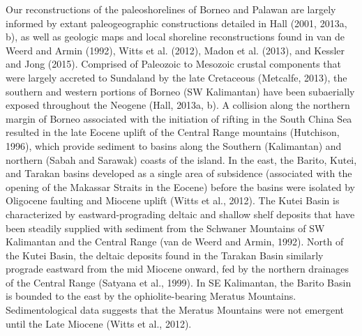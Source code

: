 \documentclass[11pt,letterpaper]{article}
\begin{document}
Our reconstructions of the paleoshorelines of Borneo and Palawan are largely informed by extant paleogeographic constructions detailed in Hall (2001, 2013a, b),  as well as geologic maps and local shoreline reconstructions found in van de Weerd and Armin (1992), Witts et al. (2012), Madon et al. (2013), and Kessler and Jong (2015). Comprised of Paleozoic to Mesozoic crustal components that were largely accreted to Sundaland by the late Cretaceous (Metcalfe, 2013), the southern and western portions of Borneo (SW Kalimantan) have been subaerially exposed throughout the Neogene (Hall, 2013a, b). A collision along the northern margin of Borneo associated with the initiation of rifting in the South China Sea resulted in the late Eocene uplift of the Central Range mountains (Hutchison, 1996), which provide sediment to basins along the Southern (Kalimantan) and northern (Sabah and Sarawak) coasts of the island. In the east, the Barito, Kutei, and Tarakan basins developed as a single area of subsidence (associated with the opening of the Makassar Straits in the Eocene) before the basins were isolated by Oligocene faulting and Miocene uplift (Witts et al., 2012). The Kutei Basin is characterized by eastward-prograding deltaic and shallow shelf deposits that have been steadily supplied with sediment from the Schwaner Mountains of SW Kalimantan and the Central Range (van de Weerd and Armin, 1992). North of the Kutei Basin, the deltaic deposits found in the Tarakan Basin similarly prograde eastward from the mid Miocene onward, fed by the northern drainages of the Central Range (Satyana et al., 1999). In SE Kalimantan, the Barito Basin is bounded to the east by the ophiolite-bearing Meratus Mountains. Sedimentological data suggests that the Meratus Mountains were not emergent until the Late Miocene (Witts et al., 2012).
\end{document}
